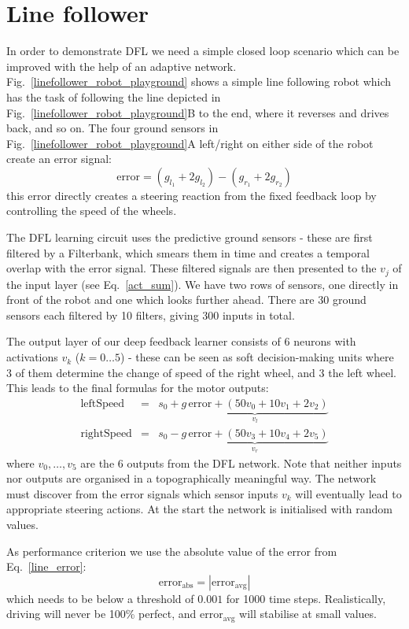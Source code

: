 \documentclass{aamas2018}
\begin{document}
\section{Line follower}
In order to demonstrate DFL we need a simple closed loop scenario
which can be improved with the help of an adaptive network.
Fig.~\ref{linefollower_robot_playground} shows a simple line following
robot which has the task of following the line depicted in
Fig.~\ref{linefollower_robot_playground}B to the end, where it
reverses and drives back, and so on. The four ground sensors in
Fig.~\ref{linefollower_robot_playground}A left/right on either side
of the robot create an error signal:
\begin{equation}
\mathrm{error} = (g_{l_1}+2 g_{l_2})-(g_{r_1}+2 g_{r_2}) \label{line_error}
\end{equation}
this error directly creates a steering reaction from the fixed
feedback loop by controlling the speed of the wheels.

The DFL learning circuit uses the predictive ground sensors - these
are first filtered by a Filterbank, which smears them in time and
creates a temporal overlap with the error signal. These filtered
signals are then presented to the $v_j$ of the input layer (see
Eq.~\ref{act_sum}). We have two rows of sensors, one directly in front
of the robot and one which looks further ahead. There are 30 ground
sensors each filtered by 10 filters, giving 300 inputs in total.

The output layer of our deep feedback learner consists of 6 neurons
with activations $v_k$ ($k=0 \ldots 5$) - these can be seen as soft
decision-making units where 3 of them determine the change of speed of
the right wheel, and 3 the left wheel. This leads to the
final formulas for the motor outputs:
\begin{eqnarray}
  \mathrm{leftSpeed} &=& s_0 + \underbrace{g\, \mathrm{error} + \left( 50 v_0 + 10 v_1 + 2 v_2 \right)}_{v_l} \\
  \mathrm{rightSpeed} &=& s_0 - \underbrace{g\, \mathrm{error} + \left( 50 v_3 + 10 v_4 + 2 v_5 \right)}_{v_r}
\end{eqnarray}
where $v_0, \ldots, v_5$ are the 6 outputs from the DFL network. Note
that neither inputs nor outputs are organised in a topographically
meaningful way. The network must discover from the error signals
which sensor inputs $v_k$ will eventually lead to appropriate steering
actions. At the start the network is initialised with random values.

As performance criterion we use the absolute value of the error from
Eq.~\ref{line_error}:
\begin{equation}
  \mathrm{error}_\mathrm{abs} =  |\mathrm{error}_\mathrm{avg}| \label{line_sqerr}
\end{equation}
which needs to be below a threshold of $0.001$ for 1000 time steps.
Realistically, driving will never be 100\% perfect, and $\mathrm{error}_\mathrm{avg}$
will stabilise at small values.
\end{document}
